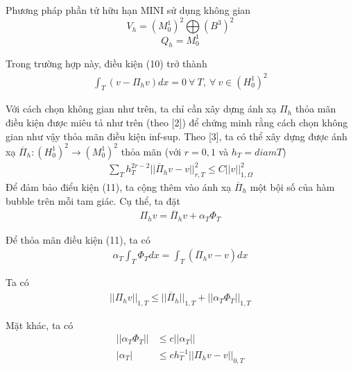 \documentclass[14pt]{extreport}
\begin{document}
{Phương pháp phần tử hữu hạn MINI sử dụng không gian
$$V_h = (M_0^1)^2 \bigoplus (B^3)^2$$
$$Q_h = M_0^1$$

Trong trường hợp này, điều kiện (10) trở thành
\begin{equation} \label{eq11}
\begin{split}
\int_T (v - \Pi_hv) dx = 0 \ \forall \ T, \ \forall \ v \in (H_0^1)^2
\end{split}
\end{equation}

Với cách chọn không gian như trên, ta chỉ cần xây dựng ánh xạ $\Pi_h$ thỏa mãn điều kiện được miêu tả như trên (theo [2]) để chứng minh rằng cách chọn không gian như vậy thỏa mãn điều kiện inf-sup. Theo [3], ta có thể xây dựng được ánh xạ $\overline{\Pi}_h: (H_0^1)^2 \rightarrow (M_0^1)^2$ thỏa mãn (với $r = 0,1$ và $h_T = diam T$)
\begin{equation} \label{eq12}
\begin{split}
\sum_T h_T^{2r-2} ||\overline{\Pi}_hv - v||_{r, T}^2 \leq C ||v||_{1, \Omega}^2
\end{split}
\end{equation}
Để đảm bảo điểu kiện (11), ta cộng thêm vào ánh xạ $\overline{\Pi}_h$ một bội số của hàm bubble trên mỗi tam giác. Cụ thể, ta đặt
\begin{equation} \label{eq13}
\begin{split}
\Pi_hv = \overline{\Pi}_hv + \alpha_T \Phi_T
\end{split}
\end{equation}

Để thỏa mãn điều kiện (11), ta có
\begin{equation} \label{eq14}
\begin{split}
\alpha_T \int_T \Phi_T dx = \int_T (\overline{\Pi}_hv - v)dx
\end{split}
\end{equation}

Ta có
\begin{equation} \label{eq15}
\begin{split}
||\Pi_hv||_{1, T} \leq ||\overline{\Pi}_h||_{1, T} + ||\alpha_T \Phi_T||_{1, T}
\end{split}
\end{equation}

Mặt khác, ta có
\begin{equation} \label{eq16}
\begin{split}
||\alpha_T \Phi_T|| & \leq c ||\alpha_T||\\
|\alpha_T| & \leq ch_T^{-1} ||\Pi_hv - v||_{0, T}
\end{split}
\end{equation}

}
\end{document}

